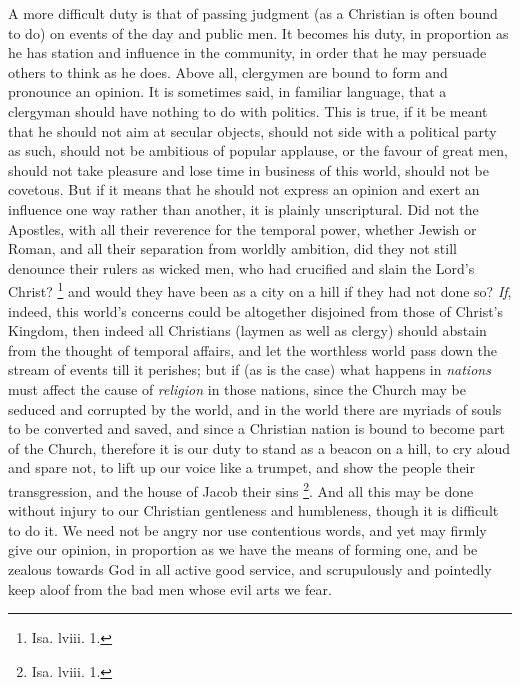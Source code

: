 A more difficult duty is that of passing judgment (as a Christian is often bound to do) on events of the day
and public men. It becomes his duty, in proportion as he
has station and influence in the community, in order that
he may persuade others to think as he does. Above all,
clergymen are bound to form and pronounce an opinion. It
is sometimes said, in familiar language, that a clergyman
should have nothing to do with politics. This is true, if
it be meant that he should not aim at secular objects,
should not side with a political party as such, should
not be ambitious of popular applause, or the favour of
great men, should not take pleasure and lose time in
business of this world, should not be covetous. But if it
means that he should not express an opinion and exert an
influence one way rather than another, it is plainly
unscriptural. Did not the Apostles, with all their
reverence for the temporal power, whether Jewish or
Roman, and all their separation from worldly ambition,
did they not still denounce their rulers as wicked men,
who had crucified and slain the Lord's Christ? \footnote{Isa. lviii. 1.} and would they have
been as a city on a hill if they had not done so? \emph{If},
indeed, this world's concerns could be altogether
disjoined from those of Christ's Kingdom, then indeed all
Christians (laymen as well as clergy) should abstain from
the thought of temporal affairs, and let the worthless
world pass down the stream of events till it perishes;
but if (as is the case) what happens in \emph{nations}
must affect the cause of \emph{religion} in those
nations, since the Church may be seduced and corrupted by
the world, and in the world there are myriads of souls to
be converted and saved, and since a Christian nation is
bound to become part of the Church, therefore it is our
duty to stand as a beacon on a hill, to cry aloud and
spare not, to lift up our voice like a trumpet, and show
the people their transgression, and the house of Jacob
their sins \footnote{Isa. lviii. 1.}. And all this may be done
without injury to our Christian gentleness and
humbleness, though it is difficult to do it. We need not
be angry nor use contentious words, and yet may firmly
give our opinion, in proportion as we have the means of
forming one, and be zealous towards God in all active
good service, and scrupulously and pointedly keep aloof
from the bad men whose evil arts we fear.

